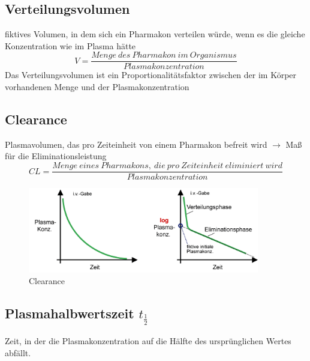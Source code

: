\documentclass[10pt,a4paper]{report}
\begin{document}
\subsection{Verteilungsvolumen}
 fiktives Volumen, in dem sich ein Pharmakon verteilen würde, wenn es die gleiche Konzentration wie im Plasma hätte 
 \begin{equation}
 	V=\frac{Menge\:des\:Pharmakon\:im\:Organismus}{Plasmakonzentration}
 \end{equation}
 Das Verteilungsvolumen ist ein Proportionalitätsfaktor zwischen der im Körper vorhandenen Menge und der Plasmakonzentration

 \subsection{Clearance}
 Plasmavolumen, das pro Zeiteinheit von einem Pharmakon befreit wird  $\rightarrow$ Maß für die Eliminationsleistung 
 \begin{equation}
 	CL=\frac{Menge\:eines\:Pharmakons,\:die\:pro\:Zeiteinheit\:eliminiert\:wird}{Plasmakonzentration}
 \end{equation}
 
\begin{figure}[h]
	\centering 
	\includegraphics[width=0.9\textwidth]{Bilder/clearance.png} 
	\caption{Clearance} 
	\label{fig:Clearance}
\end{figure}

\subsection{Plasmahalbwertszeit $t_{\frac{1}{2}}$} Zeit, in der die Plasmakonzentration auf die Hälfte des ursprünglichen Wertes abfällt.
\end{document}

